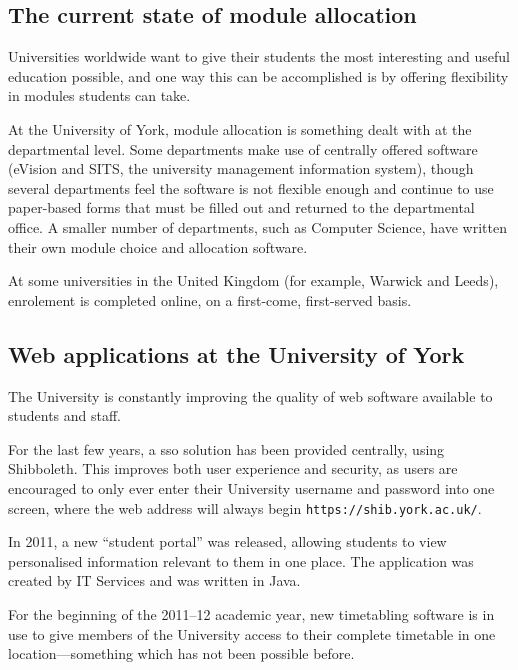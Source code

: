 \documentclass[]{scrartcl}
\begin{document}
\subsection{The current state of module allocation}


Universities worldwide want to give their students the most interesting and
useful education possible, and one way this can be accomplished is by offering
flexibility in modules students can take.

At the University of York, module allocation is something dealt with at the
departmental level. Some departments make use of centrally offered software
(eVision and SITS, the university management information system), though
several departments feel the software is not flexible enough and continue to
use paper-based forms that must be filled out and returned to the departmental
office. A smaller number of departments, such as Computer Science, have
written their own module choice and allocation software.

At some universities in the United Kingdom (for example, Warwick and Leeds),
enrolement is completed online, on a first-come, first-served basis.


\subsection{Web applications at the University of York}


The University is constantly improving the quality of web software available
to students and staff.

For the last few years, a \gls{sso} solution has been provided
centrally, using Shibboleth. This improves both user experience and security,
as users are encouraged to only ever enter their University username and
password into one screen, where the web address will always begin
\texttt{https://shib.york.ac.uk/}.

In 2011, a new ``student portal'' was released, allowing students to view
personalised information relevant to them in one place. The application was
created by IT Services and was written in Java.

For the beginning of the 2011--12 academic year, new timetabling software is in
use to give members of the University access to their complete timetable in
one location---something which has not been possible before.
\end{document}
